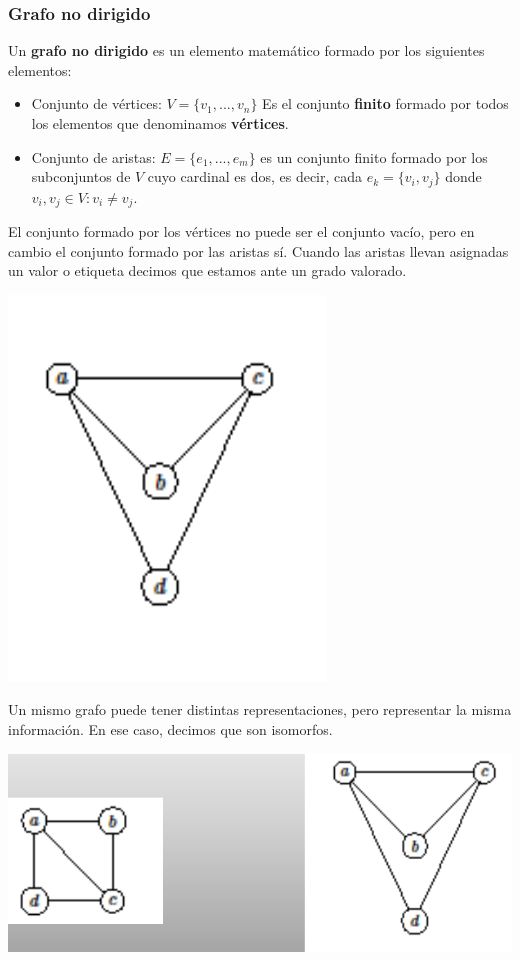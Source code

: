 \documentclass[10pt,a4paper,openright]{book}
\begin{document}
\subsubsection*{Grafo no dirigido}
Un \textbf{grafo no dirigido} es un elemento matemático formado por los siguientes elementos:
\begin{itemize}
\item Conjunto de vértices: $V=\{v_1, ..., v_n\}$
	Es el conjunto \textbf{finito} formado por todos los elementos que denominamos \textbf{vértices}.
	
\item Conjunto de aristas: $E=\{e_1, ..., e_m\}$ es un conjunto finito formado por los subconjuntos de $V$ cuyo cardinal es dos, es decir, cada $e_k=\{v_i, v_j\}$ donde $v_i,v_j\in V: v_i\neq v_j$.
\end{itemize}

El conjunto formado por los vértices no puede ser el conjunto vacío, pero en cambio el conjunto formado por las aristas sí. Cuando las aristas llevan asignadas un valor o etiqueta decimos que estamos ante un grado valorado.

\begin{center}
\includegraphics[scale=0.65]{grafo1}
\end{center}

Un mismo grafo puede tener distintas representaciones, pero representar la misma información. En ese caso, decimos que son isomorfos.
\begin{center}
\includegraphics[scale=0.65]{isomorfia grafos}
\end{center}
\end{document}
